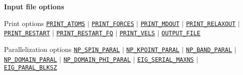 \begin{frame}[allowframebreaks]{\textbf{Input file options}}
  \begin{block}{Print options}
  \hyperlink{PRINT_ATOMS}{\texttt{PRINT\_ATOMS}} $\vert$
  \hyperlink{PRINT_FORCES}{\texttt{PRINT\_FORCES}} $\vert$
  \hyperlink{PRINT_MDOUT}{\texttt{PRINT\_MDOUT}} $\vert$
  \hyperlink{PRINT_RELAXOUT}{\texttt{PRINT\_RELAXOUT}} $\vert$
  \hyperlink{PRINT_RESTART}{\texttt{PRINT\_RESTART}} $\vert$
  \hyperlink{PRINT_RESTART_FQ}{\texttt{PRINT\_RESTART\_FQ}} $\vert$
  \hyperlink{PRINT_VELS}{\texttt{PRINT\_VELS}} $\vert$
  \hyperlink{OUTPUT_FILE}{\texttt{OUTPUT\_FILE}}
  \end{block}
  
  \begin{block}{Parallelization options}
  \hyperlink{NP_SPIN_PARAL}{\texttt{NP\_SPIN\_PARAL}} $\vert$
  \hyperlink{NP_KPOINT_PARAL}{\texttt{NP\_KPOINT\_PARAL}} $\vert$
  \hyperlink{NP_BAND_PARAL}{\texttt{NP\_BAND\_PARAL}} $\vert$
  \hyperlink{NP_DOMAIN_PARAL}{\texttt{NP\_DOMAIN\_PARAL}} $\vert$
  \hyperlink{NP_DOMAIN_PHI_PARAL}{\texttt{NP\_DOMAIN\_PHI\_PARAL}} $\vert$
  \hyperlink{EIG_SERIAL_MAXNS}{\texttt{EIG\_SERIAL\_MAXNS}} $\vert$
  \hyperlink{EIG_PARAL_BLKSZ}{\texttt{EIG\_PARAL\_BLKSZ}}
  \end{block}
  
  \end{frame}
  